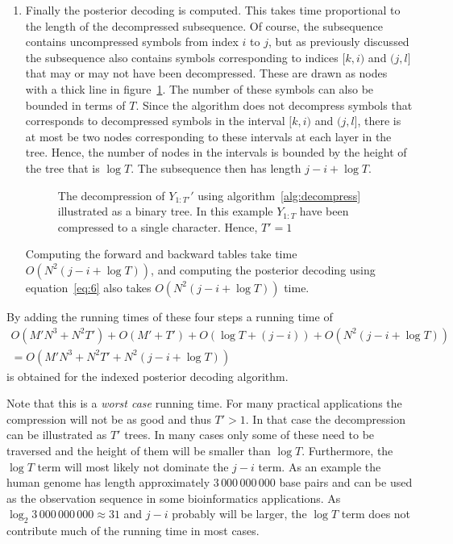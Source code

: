 \begin{enumerate}
\item Finally the posterior decoding is computed. This takes time proportional
  to the length of the decompressed subsequence. Of course, the subsequence
  contains uncompressed symbols from index $i$ to $j$, but as previously
  discussed the subsequence also contains  symbols corresponding to indices
  $[k, i)$ and $(j, l]$ that may or may not have been decompressed. These are
  drawn as nodes with a thick line in figure~\ref{fig:decompression}. The
  number of these symbols can also be bounded in terms of $T$. Since the
  algorithm does not decompress symbols that corresponds to decompressed
  symbols in the interval $[k, i)$ and $(j, l]$, there is at most be two nodes
  corresponding to these intervals at each layer in the tree. Hence, the number
  of nodes in the intervals is bounded by the height of the tree that is
  $\log T$. The subsequence then has length $j - i + \log T$.

  \begin{figure}
    \centering
    
    \caption{The decompression of $Y_{1:T'}'$ using
      algorithm~\ref{alg:decompress} illustrated as a binary tree. In this
      example $Y_{1:T}$ have been compressed to a single character. Hence,
      $T' = 1$}
    \label{fig:decompression}
  \end{figure}

  Computing the forward and backward tables take time
  $O(N^2 (j - i + \log T))$, and computing the posterior decoding using
  equation~\eqref{eq:6} also takes $O(N^2 (j - i + \log T))$ time.
\end{enumerate}
By adding the running times of these four steps a running time of
\begin{gather*}
  O\left(M' N^3 + N^2 T'\right) + O\left(M' + T'\right) + O\left(\log T + (j - i)\right) + O\left(N^2 (j - i + \log T)\right) \\
  = O\left(M' N^3 + N^2 T' + N^2 (j - i + \log T)\right)
\end{gather*}
is obtained for the indexed posterior decoding algorithm.

Note that this is a \emph{worst case} running time. For many practical
applications the compression will not be as good and thus $T' > 1$. In that
case the decompression can be illustrated as $T'$ trees. In many cases only
some of these need to be traversed and the height of them will be
smaller than $\log T$. Furthermore, the $\log T$ term will most likely not
dominate the $j - i$ term. As an example the human genome has length
approximately $3\,000\,000\,000$ base pairs and can be used as the observation sequence
in some bioinformatics applications. As $\log_2 3\,000\,000\,000 \approx 31$ and
$j - i$ probably will be larger, the $\log T$ term does not contribute much
of the running time in most cases.

